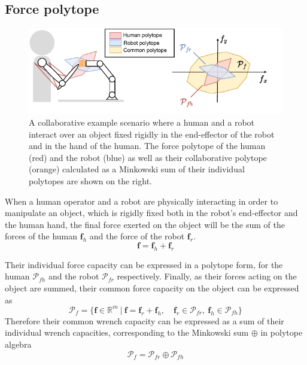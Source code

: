 \subsection{Force polytope}
\label{ch:force_collab}
\begin{figure}[!h]
    \centering
    \includegraphics[width=0.7\linewidth]{Chapters/imgs/force_collab.pdf}
    \caption{A collaborative example scenario where a human and a robot interact over an object fixed rigidly in the end-effector of the robot and in the hand of the human. The force polytope of the human (red) and the robot (blue) as well as their collaborative polytope (orange) calculated as a Minkowski sum of their individual polytopes are shown on the right.}
    \label{fig:collaboration_force}
\end{figure}

When a human operator and a robot are physically interacting in order to manipulate an object, which is rigidly fixed both in the robot's end-effector and the human hand, the final force exerted on the object will be the sum of the forces of the human $\bm{f}_h$ and the force of the robot $\bm{f}_r$.
\begin{equation}
    \bm{f} = \bm{f}_h + \bm{f}_r
\end{equation}

Their individual force capacity can be expressed in a polytope form, for the human  $\mathcal{P}_{fh}$ and the robot  $\mathcal{P}_{fr}$ respectively. Finally, as their forces acting on the object are summed, their common force capacity on the object can be expressed as
\begin{equation}
    \mathcal{P}_f = \{\bm{f}\in \mathbb{R}^m ~|~\bm{f} = \bm{f}_r + \bm{f}_h , \quad\bm{f}_r \in \mathcal{P}_{fr},~\bm{f}_h \in \mathcal{P}_{fh}\}
\end{equation}
Therefore their common wrench capacity can be expressed as a sum of their individual wrench capacities, corresponding to the Minkowski sum $\oplus$ in polytope algebra 
\begin{equation}
    \mathcal{P}_f = \mathcal{P}_{fr}\oplus \mathcal{P}_{fh}
\end{equation}


